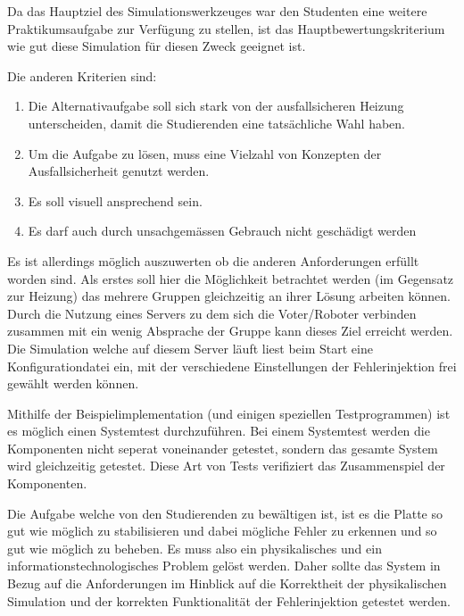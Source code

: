 {Da das Hauptziel des Simulationswerkzeuges war den Studenten eine weitere Praktikumsaufgabe zur Verf{\"{u}}gung
zu stellen, ist das Hauptbewertungskriterium wie gut diese Simulation f{\"{u}}r diesen Zweck geeignet ist.

Die anderen Kriterien sind: \todo{}

\begin{enumerate}
	\item Die Alternativaufgabe soll sich stark von der ausfallsicheren Heizung unterscheiden, damit die Studierenden eine tats{\"{a}}chliche Wahl haben.
	\item Um die Aufgabe zu l{\"{o}}sen, muss eine Vielzahl von Konzepten der Ausfallsicherheit genutzt werden.
	\item Es soll visuell ansprechend sein.
	\item Es darf auch durch unsachgem{\"{a}}ssen Gebrauch nicht gesch{\"{a}}digt werden
\end{enumerate}

Es ist allerdings m{\"{o}}glich auszuwerten ob die anderen Anforderungen erf{\"{u}}llt worden sind. Als erstes
soll hier die M{\"{o}}glichkeit betrachtet werden (im Gegensatz zur Heizung) das mehrere Gruppen gleichzeitig
an ihrer L{\"{o}}sung arbeiten k{\"{o}}nnen. Durch die Nutzung eines Servers zu dem sich die Voter/Roboter
verbinden zusammen mit ein wenig Absprache der Gruppe kann dieses Ziel erreicht werden. Die Simulation welche
auf diesem Server l{\"{a}}uft liest beim Start eine Konfigurationdatei ein, mit der verschiedene Einstellungen
der Fehlerinjektion frei gew{\"{a}}hlt werden k{\"{o}}nnen.

Mithilfe der Beispielimplementation (und einigen speziellen Testprogrammen) ist es m{\"{o}}glich einen Systemtest
durchzuf{\"{u}}hren. Bei einem Systemtest werden die Komponenten nicht seperat voneinander getestet, sondern das
gesamte System wird gleichzeitig getestet. Diese Art von Tests verifiziert das Zusammenspiel der Komponenten.

Die Aufgabe welche von den Studierenden zu bew{\"{a}}ltigen ist, ist es die Platte so gut wie m{\"{o}}glich zu
stabilisieren und dabei m{\"{o}}gliche Fehler zu erkennen und so gut wie m{\"{o}}glich zu beheben. Es muss also
ein physikalisches und ein informationstechnologisches Problem gel{\"{o}}st werden. Daher sollte das System in
Bezug auf die Anforderungen im Hinblick auf die Korrektheit der physikalischen Simulation und der korrekten
Funktionalit{\"{a}}t der Fehlerinjektion getestet werden.

}
